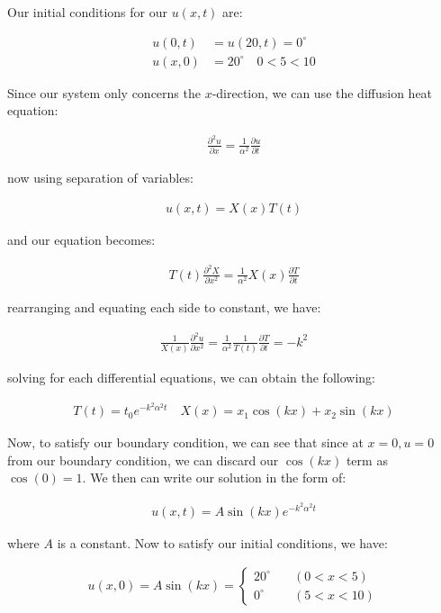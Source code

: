 \documentclass{article}
\numberwithin{equation}{section}
\begin{document}
Our initial conditions for our $u(x,t)$ are:

\begin{align}
    u(0, t) &= u(20, t) = 0^\circ \\
    u(x, 0) &= 20^\circ \quad 0 < 5 < 10
\end{align}

Since our system only concerns the $x$-direction, we can use the diffusion heat equation:

\begin{align}
    \frac{\partial^2 u}{\partial x} = \frac{1}{\alpha^2} \frac{\partial u}{\partial t}
\end{align}

now using separation of variables:

\begin{align}
    u(x,t) = X(x)T(t)
\end{align}

and our equation becomes:

\begin{align}
    T(t) \frac{\partial^2 X}{\partial x^2} = \frac{1}{\alpha^2} X(x) \frac{\partial T}{\partial t} 
\end{align}

rearranging and equating each side to constant, we have:

\begin{align}
    \frac{1}{X(x)} \frac{\partial^2 u}{\partial x^2} = \frac{1}{\alpha^2} \frac{1}{T(t)} \frac{\partial T}{\partial t} = -k^2
\end{align}

solving for each differential equations, we can obtain the following: 

\begin{align}
    T(t) = t_0 e^{-k^2 \alpha^2 t} \quad X(x) = x_1 \cos(kx) + x_2 \sin(kx)
\end{align}

Now, to satisfy our boundary condition, we can see that since at $x = 0, u = 0$ from our boundary condition, we can discard our $\cos(kx)$ term as $\cos(0) = 1$. We then can write our solution in the form of:

\begin{align}
    u(x,t) = A \sin(kx) e^{-k^2 \alpha^2 t}
\end{align}

where $A$ is a constant. Now to satisfy our initial conditions, we have:

\begin{align}
    u(x,0) = A \sin(kx) = \begin{cases}
        20^\circ \quad &(0<x<5) \\
        0^\circ \quad &(5<x<10)
    \end{cases} 
\end{align}
\end{document}

